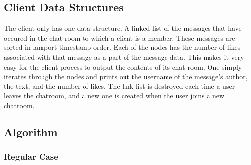 \documentclass[12pt,journal,compsoc]{IEEEtran}
\begin{document}
\subsection{Client Data Structures}
The client only has one data structure. A linked list of the messages that have occured in the chat room to which a client is a member. These messages are sorted in lamport timestamp order. Each of the nodes has the number of likes associated with that message as a part of the message data. This makes it very easy for the client process to output the contents of its chat room. One simply iterates through the nodes and prints out the username of the message's author, the text, and the number of likes.  The link list is destroyed each time a user leaves the chatroom, and a new one is created when the user joins a new chatroom.

\subsection{Algorithm}

\subsubsection{Regular Case}
\end{document}
